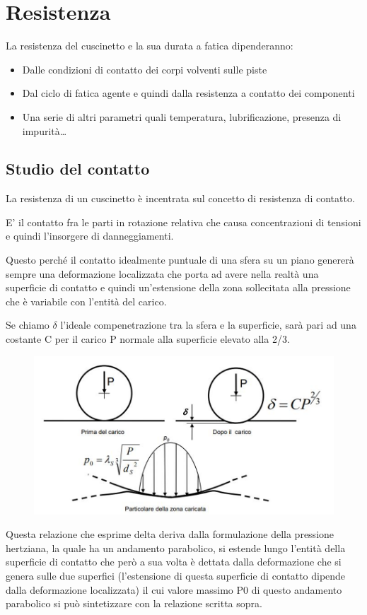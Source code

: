 \documentclass[a4paper, 15pt]{article}
\begin{document}
			\section{Resistenza}
			La resistenza del cuscinetto e la sua durata a fatica dipenderanno:
			\begin{itemize}
				\item	Dalle condizioni di contatto dei corpi volventi sulle piste
			\item	Dal ciclo di fatica agente e quindi dalla resistenza a contatto dei componenti
			\item	Una serie di altri parametri quali temperatura, lubrificazione, presenza di impurità\dots
			\end{itemize}
			
			\subsection{Studio del contatto}
			La resistenza di un cuscinetto è incentrata sul concetto di resistenza di contatto.
			
			E’ il contatto fra le parti in rotazione relativa che causa concentrazioni di tensioni e quindi l’insorgere di danneggiamenti. \newline
			
			Questo perché il contatto idealmente puntuale di una sfera su un piano genererà sempre una deformazione localizzata che porta ad avere nella realtà una superficie di contatto e quindi un’estensione della zona sollecitata alla pressione che è variabile con l’entità del carico.
			
			Se chiamo $\delta$ l’ideale compenetrazione tra la sfera e la superficie, sarà pari ad una costante C per il carico P normale alla superficie elevato alla 2/3.
			\begin{figure}[H]
				\centering
				\includegraphics[width=0.8\linewidth]{immagini/screenshot015}
				\label{fig:screenshot015}
			\end{figure}
			Questa relazione che esprime delta deriva dalla formulazione della pressione hertziana, la quale ha un andamento parabolico, si estende lungo l’entità della superficie di contatto che però a sua volta è dettata dalla deformazione che si genera sulle due superfici (l’estensione di questa superficie di contatto dipende dalla deformazione localizzata) il cui valore massimo P0 di questo andamento parabolico si può sintetizzare con la relazione scritta sopra.
\newpage			
\end{document}
